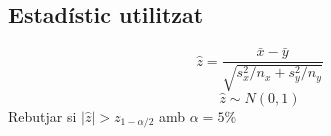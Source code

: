 \subsection{Estadístic utilitzat}
$$\hat{z} = \frac{\bar{x} - \bar{y}}{\sqrt{s_x^2/n_x + s_y^2/n_y}} $$
$$\hat{z} \sim N(0,1)$$
\centering
Rebutjar si $|\hat{z}| > z_{1 - \alpha/2}$ amb $\alpha = 5\%$

\flushleft


